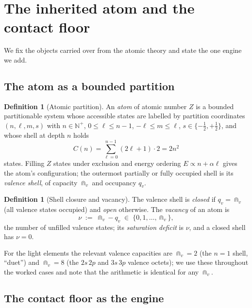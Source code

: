 \documentclass[11pt,a4paper]{article}
\theoremstyle{thmstyle}
\theoremstyle{definition}
\newtheorem{definition}[theorem]{Definition}
\theoremstyle{remark}
\newcommand{\N}{\mathbb{N}}
\newcommand{\vac}{\nu}                 %
\newcommand{\Shellcap}{C}
\begin{document}
\section{The inherited atom and the contact floor}
\label{sec:setting}

We fix the objects carried over from the atomic theory and state the one
engine we add.

\subsection{The atom as a bounded partition}

\begin{definition}[Atomic partition]
\label{def:atom}
An \emph{atom} of atomic number $Z$ is a bounded partitionable system
whose accessible states are labelled by partition coordinates
$(n,\ell,m,s)$ with $n\in\N^{+}$, $0\le\ell\le n-1$, $-\ell\le m\le\ell$,
$s\in\{-\tfrac12,+\tfrac12\}$, and whose shell at depth $n$ holds
\[
\Shellcap(n)=\sum_{\ell=0}^{n-1}(2\ell+1)\cdot 2=2n^{2}
\]
states. Filling $Z$ states under exclusion and energy ordering
$E\propto n+\alpha\ell$ gives the atom's configuration; the outermost
partially or fully occupied shell is its \emph{valence shell}, of
capacity $\Cap_v$ and occupancy $q_v$.
\end{definition}

\begin{definition}[Shell closure and vacancy]
\label{def:vacancy}
The valence shell is \emph{closed} if $q_v=\Cap_v$ (all valence states
occupied) and \emph{open} otherwise. The \emph{vacancy} of an atom is
\[
\vac \;:=\; \Cap_v - q_v \;\in\;\{0,1,\dots,\Cap_v\},
\]
the number of unfilled valence states; its \emph{saturation deficit} is
$\vac$, and a closed shell has $\vac=0$.
\end{definition}

For the light elements the relevant valence capacities are
$\Cap_v=2$ (the $n=1$ shell, ``duet'') and $\Cap_v=8$ (the
$2s\,2p$ and $3s\,3p$ valence octets); we use these throughout the
worked cases and note that the arithmetic is identical for any $\Cap_v$.

\subsection{The contact floor as the engine}
\end{document}
